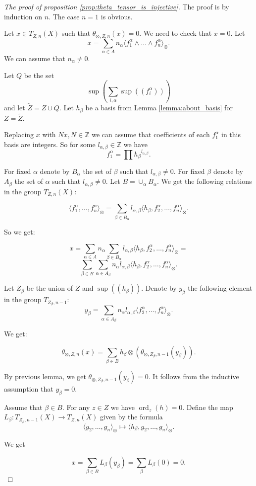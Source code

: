 \documentclass[10pt,a4paper]{amsart}
\DeclareMathOperator{\ord}{ord}
\def\Z{\mb Z}
\def\mb{\mathbb}
\def\wt{\widetilde}
\begin{document}
\begin{proof}[The proof of proposition \ref{prop:theta_tensor_is_injective}]
    The proof is by induction on $n$. The case $n=1$ is obvious.

    Let $x\in T_{ Z,n}(X)$ such that $\theta_{\otimes,Z,n}(x)=0$. We need to check that $x=0$. Let
    $$x=\sum_{\alpha\in A} n_\alpha\langle f_1^\alpha\wedge\dots\wedge f_n^\alpha\rangle_\otimes.$$
    We can assume that $n_\alpha\ne 0$.

    Let $Q$ be the set $$\sup\left(\sum_{i,\alpha}\sup((f_i^\alpha))\right)$$ and let $\wt Z=Z\cup Q$. Let $h_\beta$ be a basis from Lemma \ref{lemma:about_basis} for $Z=\wt Z$.

    Replacing $x$ with $Nx, N\in\mb Z$ we can assume that coefficients of each $f_1^\alpha$ in this basis are integers. So for some $l_{\alpha,\beta}\in\Z$ we have
    $$f_1^\alpha=\prod {h_\beta}^{l_{\alpha,\beta}}.$$

    For fixed $\alpha$ denote by $B_\alpha$ the set of $\beta$ such that $l_{\alpha,\beta}\ne 0$. For fixed $\beta$ denote by $A_\beta$ the set of $\alpha$ such that $l_{\alpha,\beta}\ne 0$. Let $B=\cup_\alpha B_\alpha$. We get the following relations in the group $T_{Z,n}(X)$:

    $$\langle f_1^\alpha,\dots, f_n^\alpha\rangle_\otimes=\sum_{\beta\in B_\alpha} l_{\alpha,\beta}\langle h_\beta,f_2^\alpha,\dots, f_n^\alpha\rangle_\otimes.$$

    So we get:

    $$x=\sum_{\alpha\in A} n_\alpha\sum_{\beta\in B_\alpha} l_{\alpha,\beta}\langle h_\beta,f_2^\alpha,\dots,f_n^\alpha\rangle_\otimes=$$
    $$\sum_{\beta\in B} \sum_{\alpha\in A_\beta} n_\alpha l_{\alpha,\beta}\langle h_\beta,f_2^\alpha,\dots,f_n^\alpha\rangle_\otimes.$$

    Let $Z_\beta$ be the union of $Z$ and $\sup((h_\beta))$. Denote by $y_\beta$ the following element in the group $T_{ Z_\beta, n-1}$:
    $$y_\beta = \sum_{\alpha\in A_\beta} n_\alpha l_{\alpha,\beta}\langle f_2^\alpha,\dots,f_n^\alpha\rangle_\otimes.$$

We get:

    $$\theta_{\otimes, Z,n}(x)=\sum_{\beta\in B} h_\beta\otimes (\theta_{\otimes, Z_\beta, n-1}(y_\beta)).$$

    By previous lemma, we get $\theta_{\otimes, Z_\beta, n-1}(y_\beta)=0$. It follows from the inductive assumption that $y_\beta=0$.

Assume that $\beta\in B$. For any $z\in Z$ we have $\ord_z(h)=0$. Define the map $L_\beta\colon T_{Z_\beta, n-1}(X)\to T_{ Z, n}(X)$ given by the formula
$$\langle g_2,\dots, g_n\rangle_\otimes\mapsto \langle h_\beta, g_2,\dots, g_n\rangle_\otimes.$$

We get

$$x=\sum_{\beta\in B} L_\beta(y_\beta)=\sum_\beta L_\beta(0)=0.$$
\end{proof}
\end{document}
